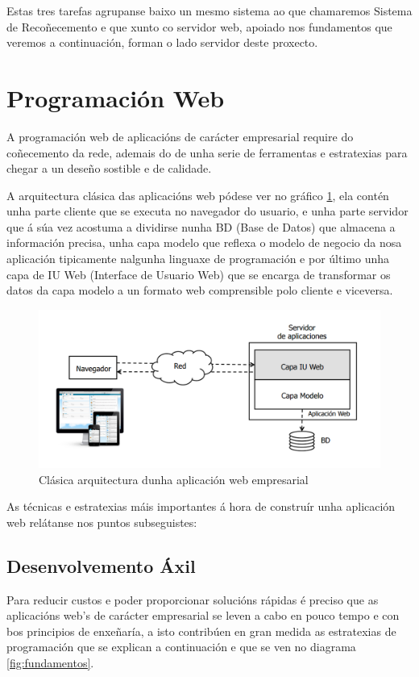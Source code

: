 	Estas tres tarefas agrupanse baixo un mesmo sistema ao que chamaremos Sistema de Recoñecemento
	e que xunto co servidor web, apoiado nos fundamentos que veremos a continuación, forman o lado
	servidor deste proxecto. 
	
\section{Programación Web}

	A programación web de aplicacións de carácter empresarial require do coñecemento da rede, ademais
	do de unha serie de ferramentas e estratexias para chegar a un deseño sostible e de calidade.
	
	A arquitectura clásica das aplicacións web pódese ver no gráfico \ref{fig:ArquitecturaAppWeb}, 
	ela contén unha parte cliente que se executa no navegador do usuario, e unha parte servidor que
	á súa vez acostuma a dividirse nunha BD (Base de Datos) que almacena a información precisa, unha 
	capa modelo que reflexa o modelo de negocio da nosa aplicación tipicamente nalgunha linguaxe 
	de programación e por último unha capa de IU Web (Interface de Usuario Web) que se encarga de 
	transformar os datos da capa modelo a un formato web comprensible polo cliente e viceversa.
	
	\begin{figure}[htp]
	\begin{center}
		\includegraphics[scale=0.35]{figures/ArquitecturaAppWeb.png}
		\caption{Clásica arquitectura dunha aplicación web empresarial}
	\label{fig:ArquitecturaAppWeb}
	\end{center}
	\end{figure}

	As técnicas e estratexias máis importantes á hora de construír unha aplicación web relátanse nos
	puntos subseguistes:
	
	\subsection {Desenvolvemento Áxil}
		Para reducir custos e poder proporcionar solucións rápidas é preciso que as 
		aplicacións web's de carácter empresarial se leven a cabo en pouco tempo e con
		bos principios de enxeñaría, a isto contribúen en gran medida as estratexias de programación 
		que se explican a continuación e que se ven no diagrama \ref{fig:fundamentos}.
		
